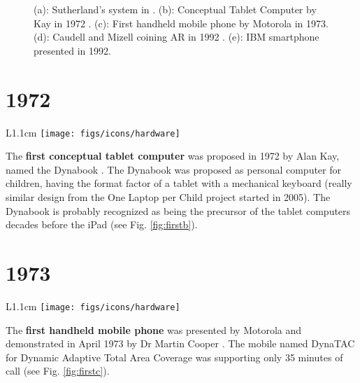\documentclass[12pt,a4paper]{article}
\begin{document}
\begin{figure}[tbp]
\vspace{-10pt}
\centering
{} \hfill
{} \hfill
{}
 \hfill
{}
\vspace{-10pt}
\caption{(a): Sutherland's system in \cite{Sutherland1968}. (b): Conceptual Tablet Computer by Kay in 1972 \cite{Kay72}. (c): First handheld mobile phone by Motorola in 1973. (d): Caudell and Mizell coining AR in 1992 \cite{Caudell92}. (e): IBM smartphone presented in 1992.} \label{fig:first}
\end{figure}

\vspace{-5pt}
\section*{1972}

\begin{wrapfigure}{L}{1.1cm}
	\vspace{-17pt}	
	\texttt{[image: figs/icons/hardware]}
	\vspace{-15pt}		
\end{wrapfigure}
The \textbf{first conceptual tablet computer} was proposed in 1972 by Alan Kay, named the Dynabook \cite{Kay72}. The Dynabook was proposed as personal computer for children, having the format factor of a tablet with a mechanical keyboard (really similar design from the One Laptop per Child project started in 2005). The Dynabook is probably recognized as being the precursor of the tablet computers decades before the iPad (see Fig. \ref{fig:firstb}).

\vspace{-5pt}
\section*{1973}

\begin{wrapfigure}{L}{1.1cm}
	\vspace{-17pt}	
	\texttt{[image: figs/icons/hardware]}
	\vspace{-15pt}		
\end{wrapfigure}
The \textbf{first handheld mobile phone} was presented by Motorola and demonstrated in April 1973 by Dr Martin Cooper \cite{Cooper73}. The mobile named DynaTAC for Dynamic Adaptive Total Area Coverage was supporting only 35 minutes of call (see Fig. \ref{fig:firstc}).
\end{document}
